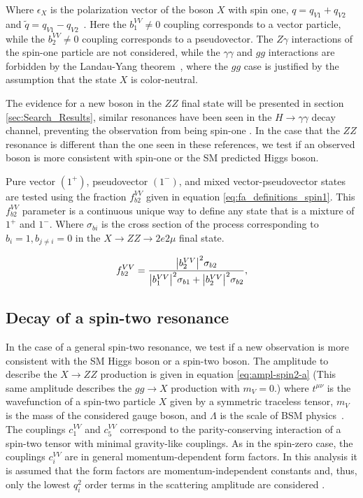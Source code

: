 Where $\epsilon_{X}$ is the polarization vector of the boson $X$ with spin one, ${q}=q_{V1}+q_{V2}$ and ${\tilde q}=q_{V1}-q_{V2}$~\cite{Gao:2010qx, Bolognesi:2012mm}. Here the $b_{1}^{VV}  \neq 0$ coupling corresponds to a vector particle, while the $b_{2}^{VV} \neq 0$ coupling corresponds to a pseudovector. The $Z\gamma$ interactions of the spin-one particle are not considered, while the $\gamma\gamma$  and $gg$ interactions are forbidden by the Landau-Yang theorem~\cite{Landau:1948kw, Yang:1950rg}, where the $gg$ case is justified by the assumption that the state $X$ is color-neutral.

The evidence for a new boson in the $ZZ$ final state will be presented in section \ref{sec:Search_Results}, similar resonances have been seen in the $H \to \gamma\gamma$ decay channel, preventing the observation from being spin-one \cite{Aad:2012tfa,Chatrchyan:2012ufa,Chatrchyan:2013lba}. In the case that the $ZZ$ resonance is different than the one seen in these references, we test if an observed boson is more consistent with spin-one or the SM predicted Higgs boson. 

Pure vector $\left(1^{+}\right)$, pseudovector $\left(1^{-}\right)$, and mixed vector-pseudovector states are tested using the fraction $f_{b2}^{VV}$ given in equation \eqref{eq:fa_definitions_spin1}. This $f_{b2}^{VV}$ parameter is a continuous unique way to define any state that is a mixture of $1^{+}$ and $1^{-}$. Where $\sigma_{bi}$ is the cross section of the process corresponding to $b_{i} = 1, b_{j\neq i} = 0$ in the $X \to ZZ \to 2e2\mu$ final state.

\begin{equation}
f_{b2}^{VV}  = \frac{\abs{b_{2}^{VV}}^2 \sigma_{b2}}{\abs{b_{1}^{VV}}^2 \sigma_{b1} + \abs{b_{2}^{VV}}^2 \sigma_{b2}},
\label{eq:fa_definitions_spin1}
\end{equation}

\subsection{Decay of a spin-two resonance}
\label{sec:Spin2_Pheno}

In the case of a general spin-two resonance, we test if a new observation is more consistent with the SM Higgs boson or a spin-two boson. The amplitude to describe the $X \to ZZ$ production is given in equation \eqref{eq:ampl-spin2-a} (This same amplitude describes the $gg \to X$ production with $m_{V} = 0$.) where $t^{\mu\nu}$ is the wavefunction of a spin-two particle $X$ given by a symmetric traceless tensor, $m_{V}$ is the mass of the considered gauge boson, and $\Lambda$ is the scale of BSM physics~\cite{Gao:2010qx, Bolognesi:2012mm}. The couplings $c_{1}^{VV}$ and $c_{5}^{VV}$ correspond to the parity-conserving interaction of a spin-two tensor with minimal gravity-like couplings. As in the spin-zero case, the couplings $c_{i}^{VV}$ are in general momentum-dependent form factors. In this analysis it is assumed that the form factors are momentum-independent constants and, thus, only the lowest $q_i^2$  order terms in the scattering amplitude are considered \cite{Khachatryan:2014kca}.



